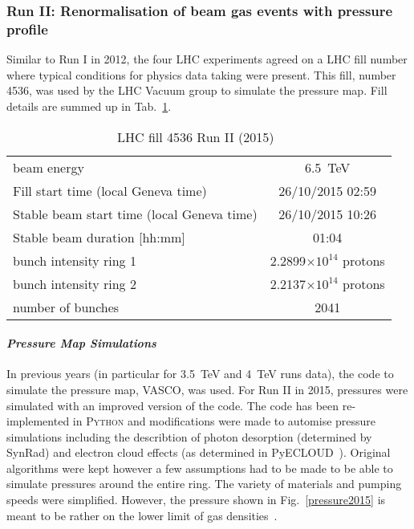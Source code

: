 \subsubsection{Run II: Renormalisation of beam gas events with pressure profile}

Similar to Run I in 2012, the four LHC experiments agreed on a LHC fill number where typical conditions for physics data taking were present. This fill, number 4536, was used by the LHC Vacuum group to simulate the pressure map. Fill details are summed up in Tab.~\ref{tab:fillRunII}. 

\begin{table}
   \centering
   \caption{LHC fill 4536 Run II (2015)~\cite{refAccStats}}
   \begin{tabular}{l||c}
       \hline
       beam energy  & 6.5~TeV \\
       Fill start time (local Geneva time) & 26/10/2015 02:59\\
       Stable beam start time (local Geneva time) & 26/10/2015 10:26\\
       Stable beam duration [hh:mm] & 01:04\\
       bunch intensity ring 1& 2.2899$\times 10^{14}$ protons\\
       bunch intensity ring 2& 2.2137$\times 10^{14}$ protons\\
       number of bunches & 2041 \\
       \hline
   \end{tabular}
   \label{tab:fillRunII}
\end{table}

\paragraph{\textit{Pressure Map Simulations}}
In previous years (in particular for 3.5~TeV and 4~TeV runs data), the code to simulate the pressure map, VASCO, was used. For Run II in 2015, pressures were simulated with an improved version of the code. The code has been re-implemented in \textsc{Python} and modifications were made to automise pressure simulations\cite{christinasStudent} including the describtion of photon desorption (determined by SynRad) and electron cloud effects (as determined in PyECLOUD~\cite{giovanniPhd}). Original algorithms were kept however a few assumptions had to be made to be able to simulate pressures around the entire ring. The variety of materials and pumping speeds were simplified. However, the pressure shown in Fig.~\ref{pressure2015} is meant to be rather on the lower limit of gas densities~\cite{christinaPriv}. 

